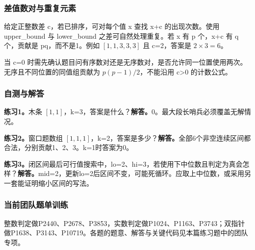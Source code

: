 \subsubsection{差值数对与重复元素}
给定正整数差 c，若已排序，可对每个值 x 查找 x+c 的出现次数。使用 upper\_bound 与 lower\_bound 之差可自然处理重复。若 x 有 p 个，x+c 有 q 个，贡献是 pq，而不是1。例如 $[1,1,3,3,3]$ 且 c=2，答案是 $2\times3=6$。

当 c=0 时需先确认题目问有序数对还是无序数对，是否允许同一位置使用两次。无序且不同位置的同值组贡献为 $p(p-1)/2$，不能沿用 c>0 的计数公式。

\subsubsection{自测与解答}
\textbf{练习1。}木条 $[1,1]$，k=3，答案是什么？\textbf{解答。}0。最大段长哨兵必须覆盖无解情况。

\textbf{练习2。}窗口题数组 $[1,1,1]$，k=2，答案是多少？\textbf{解答。}全部6个非空连续区间都合法，分别贡献1、2、3。k=1时答案为0。

\textbf{练习3。}闭区间最后可行值搜索中，lo=2、hi=3，若使用下中位数且判定为真会怎样？\textbf{解答。}mid=2，更新lo=2后区间不变，可能死循环。应取上中位数，或采用另一套能证明缩小区间的写法。
\newpage

\subsubsection{当前团队题单训练}
整数判定做P2440、P2678、P3853，实数判定做P1024、P1163、P3743；双指针做P1638、P3143、P10719。各题的题意、解答与关键代码见本篇练习题中的团队专项。
